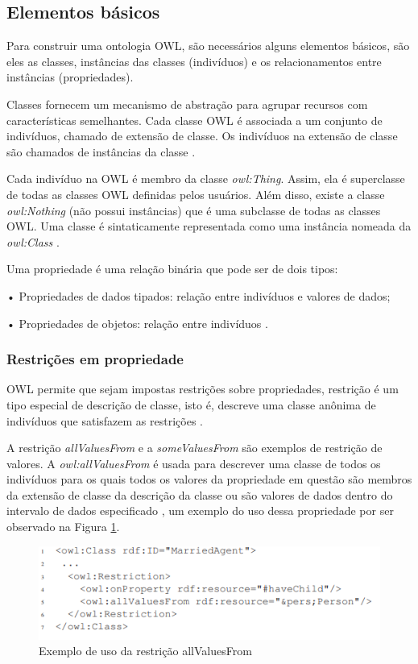 \documentclass{bcc}
\begin{document}
\subsection{Elementos básicos}
 
Para construir uma ontologia OWL, são necessários alguns elementos básicos, são eles as classes, instâncias das classes (indivíduos) e os relacionamentos entre instâncias (propriedades).
 
Classes fornecem um mecanismo de abstração para agrupar recursos com características semelhantes. Cada classe OWL é associada a um conjunto de indivíduos, chamado de extensão de classe. Os indivíduos na extensão de classe são chamados de instâncias da classe \cite{mcguinness}. 

Cada indivíduo na OWL é membro da classe \textit{owl:Thing}. Assim, ela é superclasse de todas as classes OWL definidas pelos usuários. Além disso, existe a classe \textit{owl:Nothing} (não possui instâncias) que é uma subclasse de todas as classes OWL. Uma classe é sintaticamente representada como uma instância nomeada da \textit{owl:Class} \cite{de2005}.

Uma propriedade é uma relação binária que pode ser de dois tipos:

• Propriedades de dados tipados: relação entre indivíduos e valores
de dados;

• Propriedades de objetos: relação entre indivíduos \cite{welty2004}.

\subsubsection{Restrições em propriedade}

OWL permite que sejam impostas restrições sobre propriedades, restrição é um tipo especial de descrição de classe, isto é, descreve uma classe anônima de indivíduos que satisfazem as restrições \cite{de2005}.

A restrição \textit{allValuesFrom} e a \textit{someValuesFrom} são exemplos de restrição de valores. A \textit{owl:allValuesFrom} é usada para descrever uma classe de todos os indivíduos para os quais todos os valores da propriedade em questão são membros da extensão de classe da descrição da classe ou são valores de dados dentro do intervalo de dados especificado \cite{welty2004}, um exemplo do uso dessa propriedade por ser observado na Figura \ref{fig:allvalues}.

\begin{figure}[H]
\centering
\includegraphics[width=.9\textwidth]{Figuras/all_values.PNG}
\caption{Exemplo de uso da restrição allValuesFrom}
\label{fig:allvalues}
\end{figure}
\end{document}
